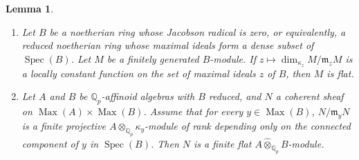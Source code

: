 \documentclass[12pt]{article}
\newtheorem{lemma}[theorem]{Lemma}
\theoremstyle{definition}
\numberwithin{equation}{theorem}
\newcommand{\gothm}{\mathfrak{m}}
\newcommand{\QQ}{\mathbb{Q}}
\def\Qp{\QQ_p}
\DeclareMathOperator{\Max}{Max}
\DeclareMathOperator{\Spec}{Spec}
\begin{document}
\begin{lemma}
\label{L:constant dimension function implies flat}
\begin{enumerate}
\item[(1)]
Let $B$ be a noetherian ring whose Jacobson radical is zero, or
equivalently, a reduced noetherian ring whose maximal ideals form a
dense subset of $\Spec(B)$. Let $M$ be a finitely generated
$B$-module.  If $z \mapsto \dim_{\kappa_z} M/\gothm_zM$ is a locally
constant function on the set of maximal ideals $z$ of $B$, then $M$ is
flat.
\item[(2)]
Let $A$ and $B$ be $\Qp$-affinoid algebras with $B$ \emph{reduced},
and $N$ a coherent sheaf on $\Max(A) \times \Max(B)$.  Assume that for
every $y \in \Max(B)$, $N/\gothm_yN$ is a finite projective $A
\otimes_{\Qp} \kappa_y$-module of rank depending only on the connected
component of $y$ in $\Spec(B)$.  Then $N$ is a finite flat $A \widehat
\otimes_{\Qp} B$-module.
\end{enumerate}
\end{lemma}
\end{document}
